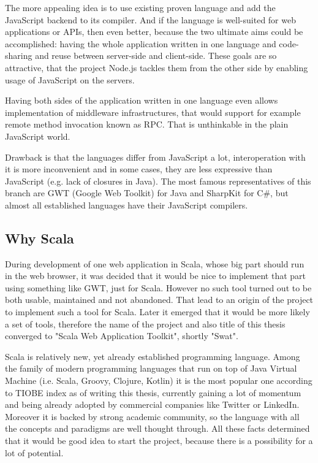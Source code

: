 \documentclass[12pt,a4paper]{report}
\begin{document}
The more appealing idea is to use existing proven language and add the JavaScript backend to its compiler. And if the language is well-suited for web applications or APIs, then even better, because the two ultimate aims could be accomplished: having the whole application written in one language and code-sharing and reuse between server-side and client-side. These goals are so attractive, that the project Node.js\cite{NodeJs} tackles them from the other side by enabling usage of JavaScript on the servers.

Having both sides of the application written in one language even allows implementation of middleware infrastructures, that would support for example remote method invocation known as RPC\cite{Rpc}. That is unthinkable in the plain JavaScript world.

Drawback is that the languages differ from JavaScript a lot, interoperation with it is more inconvenient and in some cases, they are less expressive than JavaScript (e.g. lack of closures in Java). The most famous representatives of this branch are GWT (Google Web Toolkit\cite{Gwt}) for Java and SharpKit\cite{SharpKit} for C\#, but almost all established languages have their JavaScript compilers.

\subsection{Why Scala}

During development of one web application in Scala, whose big part should run in the web browser, it was decided that it would be nice to implement that part using something like GWT, just for Scala. However no such tool turned out to be both usable, maintained and not abandoned. That lead to an origin of the project to implement such a tool for Scala. Later it emerged that it would be more likely a set of tools, therefore the name of the project and also title of this thesis converged to "Scala Web Application Toolkit", shortly "Swat".

Scala is relatively new, yet already established programming language. Among the family of modern programming languages that run on top of Java Virtual Machine (i.e. Scala, Groovy, Clojure, Kotlin) it is the most popular one according to TIOBE index\cite{Tiobe} as of writing this thesis, currently gaining a lot of momentum and being already adopted by commercial companies like Twitter or LinkedIn. Moreover it is backed by strong academic community, so the language with all the concepts and paradigms are well thought through. All these facts determined that it would be good idea to start the project, because there is a possibility for a lot of potential.
\end{document}
